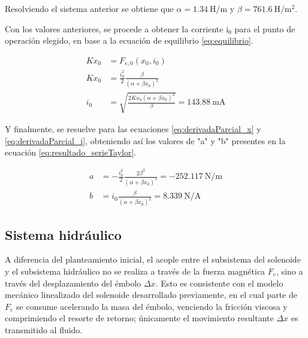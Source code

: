 \documentclass[journal]{IEEEtran}
\begin{document}
Resolviendo el sistema anterior se obtiene que $\alpha = 1.34~\mathrm{H/m}$ y $\beta = 761.6~\mathrm{H/m^2}$.



Con los valores anteriores, se procede a obtener la corriente $\mathrm{i_{0}}$ para el punto de operación elegido, 
en base a la ecuación de equilibrio \ref{eq:equilibrio}.

\begin{equation}
\begin{aligned}
    Kx_{0} &= F_{e, 0}(x_{0}, i_{0}) \\
    Kx_{0} &= \frac{i_{0}^2}{2} \frac{\beta}{(\alpha + \beta x_{0})^2} \\
    i_{0}  &= \sqrt{\frac{2Kx_{0}(\alpha + \beta x_{0})^2}{\beta}} = 143.88~\mathrm{mA}
\end{aligned}
\label{eq:corriente_punto_operacion}
\end{equation}

Y finalmente, se resuelve para las ecuaciones \ref{eq:derivadaParcial_x} y \ref{eq:derivadaParcial_i}, 
obteniendo así los valores de "a" y "b" presentes en la ecuación \ref{eq:resultado_serieTaylor}.

\begin{equation}
\begin{aligned}
    a &= -\frac{i_{0}^2}{2} \frac{2 \beta^2}{(\alpha + \beta x_{0})^3} = -252.117~\mathrm{N/m} \\
    b &= i_{0} \frac{\beta}{(\alpha + \beta x_{0})^2} = 8.339~\mathrm{N/A}
\end{aligned}
\label{eq:valores_a_b}
\end{equation}










\subsection{Sistema hidráulico}

A diferencia del planteamiento inicial, el acople entre el subsistema del 
solenoide y el subsistema hidráulico no se realiza a través de la fuerza 
magnética $F_e$, sino a través del desplazamiento del émbolo $\Delta x$. 
Esto es consistente con el modelo mecánico linealizado del solenoide 
desarrollado previamente, en el cual parte de $F_e$ se consume acelerando la 
masa del émbolo, venciendo la fricción viscosa y comprimiendo el resorte de 
retorno; únicamente el movimiento resultante $\Delta x$ es transmitido al 
fluido.
\end{document}
